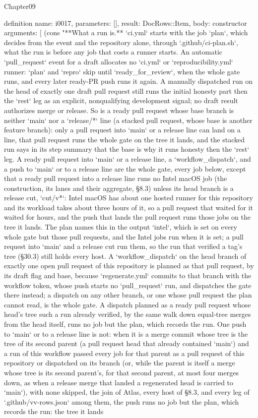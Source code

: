 \begin{lexlean}{Chapter09}
\begin{semanticmodule}
definition{
  name: i0017,
  parameters: [],
  result: DocRows::Item,
  body: constructor{
    arguments: [
      (cons "**What a run is.** `ci.yml` starts with the job `plan`, which decides from the event and the repository alone, through `.github/ci-plan.sh`, what the run is before any job that costs a runner starts. An automatic `pull_request` event for a draft allocates no `ci.yml` or `reproducibility.yml` runner: `plan` and `repro` skip until `ready_for_review`, when the whole gate runs, and every later ready-PR push runs it again. A manually dispatched run on the head of exactly one draft pull request still runs the initial honesty part then the `rest` leg as an explicit, nonqualifying development signal; no draft result authorizes merge or release. So is a ready pull request whose base branch is neither `main` nor a `release/*` line (a stacked pull request, whose base is another feature branch): only a pull request into `main` or a release line can land on a line, that pull request runs the whole gate on the tree it lands, and the stacked run says in its step summary that the base is why it runs honesty then the `rest` leg. A ready pull request into `main` or a release line, a `workflow_dispatch`, and a push to `main` or to a release line are the whole gate, every job below, except that a ready pull request into a release line runs no Intel macOS job (the construction, its lanes and their aggregate, §8.3) unless its head branch is a release cut, `cut/v*`: Intel macOS has about one hosted runner for this repository and its workload takes about three hours of it, so a pull request that waited for it waited for hours, and the push that lands the pull request runs those jobs on the tree it lands. The plan names this in the output `intel`, which is set on every whole gate but those pull requests, and the Intel jobs run when it is set; a pull request into `main` and a release cut run them, so the run that verified a tag's tree (§30.3) still holds every host. A `workflow_dispatch` on the head branch of exactly one open pull request of this repository is planned as that pull request, by its draft flag and base, because `regenerate.yml` commits to that branch with the workflow token, whose push starts no `pull_request` run, and dispatches the gate there instead; a dispatch on any other branch, or one whose pull request the plan cannot read, is the whole gate. A dispatch planned as a ready pull request whose head's tree such a run already verified, by the same walk down equal-tree merges from the head itself, runs no job but the plan, which records the run. One push to `main` or to a release line is not: when it is a merge commit whose tree is the tree of its second parent (a pull request head that already contained `main`) and a run of this workflow passed every job for that parent as a pull request of this repository or dispatched on its branch (or, while the parent is itself a merge whose tree is its second parent's, for that second parent, at most four merges down, as when a release merge that landed a regenerated head is carried to `main`), with none skipped, the join of Atlas, every host of §8.3, and every leg of `.github/vv-rows.json` among them, the push runs no job but the plan, which records the run: the tree it lands }}
\end{semanticmodule}
\end{lexlean}
